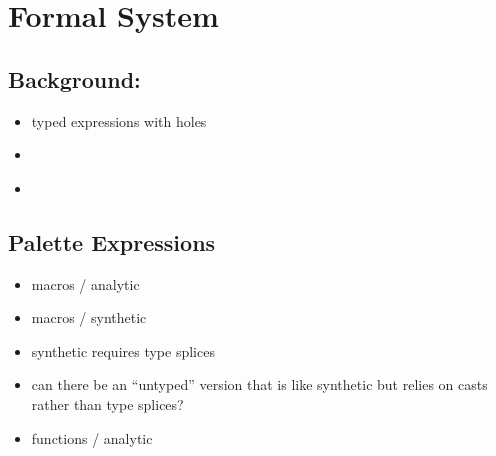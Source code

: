 \section{Formal System}

\subsection{Background: \Hazelnut}

\begin{itemize}

\item typed expressions with holes

\end{itemize}


\begin{itemize}

\item \cite{Hazelnut}

\end{itemize}


\begin{itemize}

\item \cite{HazelnutLive}

\end{itemize}

\subsection{Palette Expressions}


\begin{itemize}

\item macros / analytic

\item macros / synthetic

\item synthetic requires type splices

\item can there be an ``untyped'' version that is like synthetic but relies on casts rather than type splices?

\end{itemize}


\begin{itemize}

\item functions / analytic

\end{itemize}

